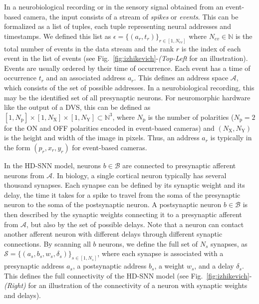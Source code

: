 \documentclass[default]{sn-jnl}%
\theoremstyle{thmstyleone}%
\theoremstyle{thmstyletwo}%
\theoremstyle{thmstylethree}%
\newcommand{\seeFig}[1]{see Fig.~\ref{fig:#1}}%
\newcommand{\presynaddr}{a} %
\newcommand{\postsynaddr}{b} %
\newcommand{\numevent}{N_{ev}} %
\newcommand{\presynaddrspace}{\mathcal{A}} %
\newcommand{\postsynaddrspace}{\mathcal{B}} %
\newcommand{\Npol}{N_\text{p}} %
\newcommand{\arank}{r} %
\newcommand{\synapse}{\mathcal{S}} %
\newcommand{\synapticweight}{w} %
\newcommand{\synapticdelay}{\delta} %
\newcommand{\ranksyn}{s} %
\newcommand{\Nsyn}{N_{s}} %
\newcommand{\timev}{t} %
\newcommand{\polev}{p} %
\newcommand{\event}{\epsilon} %
\newcommand{\Nx}{N_\text{X}}
\newcommand{\Ny}{N_\text{Y}}
\begin{document}
In a neurobiological recording or in the sensory signal obtained from an event-based camera, the input consists of a stream of \emph{spikes} or \emph{events}. This can be formalized as a list of tuples, each tuple representing neural addresses and timestamps. We defined this list as $\event = \{(\presynaddr_\arank, \timev_\arank)\}_{\arank \in [1,\numevent]}$ where $\numevent \in \mathbb{N} $ is the total number of events in the data stream and the rank $\arank$ is the index of each event in the list of events (\seeFig{izhikevich}-\textit{(Top-Left} for an illustration). Events are usually ordered by their time of occurrence. Each event has a time of occurrence $\timev_\arank$ and an associated address $\presynaddr_\arank$. This defines an address space $\presynaddrspace$, which consists of the set of possible addresses. In a neurobiological recording, this may be the identified set of all presynaptic neurons. For neuromorphic hardware like the output of a DVS, this can be defined as $[1, \Npol] \times [1, \Nx]\times[1, \Ny] \subset \mathbb{N}^3$, where $\Npol$ is the number of polarities ($\Npol=2$ for the ON and OFF polarities encoded in event-based cameras) and $(\Nx, \Ny)$ is the height and width of the image in pixels. Thus, an address $\presynaddr_\arank$ is typically in the form $(\polev_\arank, x_\arank, y_\arank)$ for event-based cameras.

In the HD-SNN model, neurons $\postsynaddr \in \postsynaddrspace$ are connected to presynaptic afferent neurons from $\presynaddrspace$. In biology, a single cortical neuron typically has several thousand synapses. Each synapse can be defined by its synaptic weight and its delay, the time it takes for a spike to travel from the soma of the presynaptic neuron to the soma of the postsynaptic neuron. A postsynaptic neuron $\postsynaddr \in \postsynaddrspace$ is then described by the synaptic weights connecting it to a presynaptic afferent from $\presynaddrspace$, but also by the set of possible delays. Note that a neuron can contact another afferent neuron with different delays through different synaptic connections. By scanning all $\postsynaddr$ neurons, we define the full set of $\Nsyn$ synapses, 
as $\synapse = \{(\presynaddr_\ranksyn, \postsynaddr_\ranksyn, \synapticweight_\ranksyn, \synapticdelay_\ranksyn)\}_{\ranksyn \in [1,\Nsyn]}$, where each synapse is associated with a presynaptic address $\presynaddr_\ranksyn$, a postsynaptic address $\postsynaddr_\ranksyn$, a weight $\synapticweight_\ranksyn$, and a delay $\synapticdelay_\ranksyn$. This defines the full connectivity of the HD-SNN model (\seeFig{izhikevich}-\textit{(Right)} for an illustration of the connectivity of a neuron with synaptic weights and delays).
\end{document}
